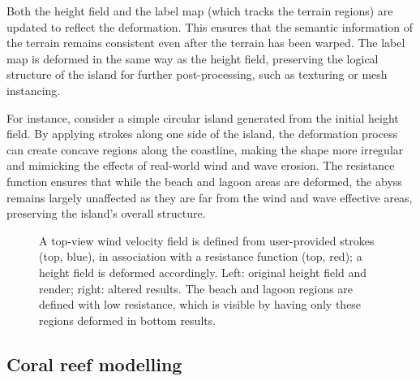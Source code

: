 Both the height field and the label map (which tracks the terrain regions) are updated to reflect the deformation. This ensures that the semantic information of the terrain remains consistent even after the terrain has been warped. The label map is deformed in the same way as the height field, preserving the logical structure of the island for further post-processing, such as texturing or mesh instancing.

For instance, consider a simple circular island generated from the initial height field. By applying strokes along one side of the island, the deformation process can create concave regions along the coastline, making the shape more irregular and mimicking the effects of real-world wind and wave erosion. The resistance function ensures that while the beach and lagoon areas are deformed, the abyss remains largely unaffected as they are far from the wind and wave effective areas, preserving the island's overall structure.

\begin{figure}
\caption{A top-view wind velocity field is defined from user-provided strokes (top, blue), in association with a resistance function (top, red); a height field is deformed accordingly. Left: original height field and render; right: altered results. The beach and lagoon regions are defined with low resistance, which is visible by having only these regions deformed in bottom results.}
\label{fig:coral-island-wind-effect-result}
\end{figure}

\subsection{Coral reef modelling}
\label{sec:coral-island-coral-reef}


